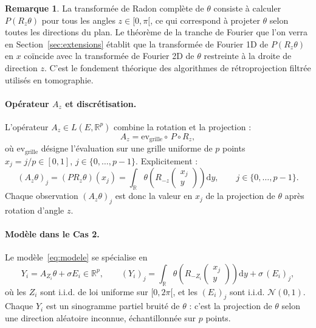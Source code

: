 \documentclass[12pt, a4paper]{article}
\theoremstyle{definition}
\newtheorem{remark}[theorem]{Remarque}
\newcommand{\R}{\mathbb{R}}
\newcommand{\Ncal}{\mathcal{N}}
\begin{document}
\begin{remark}
    La transformée de Radon complète de $\theta$ consiste à calculer $P(R_z\theta)$
    pour tous les angles $z \in [0, \pi[$, ce qui correspond à projeter $\theta$ selon
    toutes les directions du plan. Le théorème de la tranche de Fourier que l'on verra 
    en Section~\ref{sec:extensions} établit que la
    transformée de Fourier 1D de $P(R_z\theta)$ en $x$ coïncide avec la transformée
    de Fourier 2D de $\theta$ restreinte à la droite de direction $z$. C'est le
    fondement théorique des algorithmes de rétroprojection filtrée utilisés en
    tomographie.
\end{remark}

\paragraph{Opérateur $A_z$ et discrétisation.}
L'opérateur $A_z \in L(E, \R^p)$ combine la rotation et la projection :
\[
    A_z = \mathrm{ev}_{\text{grille}} \circ\, P \circ R_z,
\]
où $\mathrm{ev}_{\text{grille}}$ désigne l'évaluation sur une grille uniforme
de $p$ points $x_j = j/p \in [0, 1]$, $j \in \{0, \ldots, p-1\}$. Explicitement :
\[
    (A_z\theta)_j = (P R_z\theta)(x_j) = \int_{\R} \theta\!\left(R_{-z}
    \begin{pmatrix} x_j \\ y \end{pmatrix}\right)\mathrm{d}y,
    \qquad j \in \{0, \ldots, p-1\}.
\]
Chaque observation $(A_z\theta)_j$ est donc la valeur en $x_j$ de la projection
de $\theta$ après rotation d'angle $z$.

\paragraph{Modèle dans le Cas 2.}
Le modèle~\eqref{eq:modele} se spécialise en
\[
    Y_i = A_{Z_i}\theta + \sigma E_i \in \R^p, \qquad
    (Y_i)_j = \int_{\R} \theta\!\left(R_{-Z_i}\begin{pmatrix}x_j\\y\end{pmatrix}\right)
    \mathrm{d}y + \sigma\,(E_i)_j,
\]
où les $Z_i$ sont i.i.d. de loi uniforme sur $[0, 2\pi[$, et les $(E_i)_j$ sont
i.i.d. $\Ncal(0,1)$. Chaque $Y_i$ est un sinogramme partiel bruité de $\theta$ :
c'est la projection de $\theta$ selon une direction aléatoire inconnue,
échantillonnée sur $p$ points.
\end{document}
